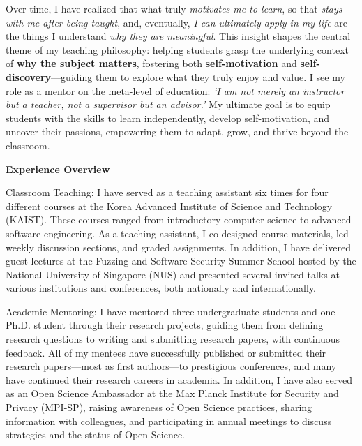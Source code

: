 \documentclass{article}
\begin{document}
\thispagestyle{firstpage} %

\noindent Over time, I have realized that what truly \emph{motivates me to learn}, so that \emph{stays with me after being taught}, and, eventually, \emph{I can ultimately apply in my life} are the things I understand \emph{why they are meaningful}. This insight shapes the central theme of my teaching philosophy: helping students grasp the underlying context of \textbf{why the subject matters}, fostering both \textbf{self-motivation} and \textbf{self-discovery}—guiding them to explore what they truly enjoy and value. I see my role as a mentor on the meta-level of education: \emph{`I am not merely an instructor but a teacher, not a supervisor but an advisor.'} My ultimate goal is to equip students with the skills to learn independently, develop self-motivation, and uncover their passions, empowering them to adapt, grow, and thrive beyond the classroom.

\vspace{.5em}\noindent\textbf{Experience Overview}\vspace{.5em}

\noindent Classroom Teaching: I have served as a teaching assistant six times for four different courses at the Korea Advanced Institute of Science and Technology (KAIST). These courses ranged from introductory computer science to advanced software engineering. As a teaching assistant, I co-designed course materials, led weekly discussion sections, and graded assignments.
In addition, I have delivered guest lectures at the Fuzzing and Software Security Summer School hosted by the National University of Singapore (NUS) and presented several invited talks at various institutions and conferences, both nationally and internationally.

\vspace{0.5em}
\noindent Academic Mentoring:  I have mentored three undergraduate students and one Ph.D. student through their research projects, guiding them from defining research questions to writing and submitting research papers, with continuous feedback. All of my mentees have successfully published or submitted their research papers—most as first authors—to prestigious conferences, and many have continued their research careers in academia. In addition, I have also served as an Open Science Ambassador at the Max Planck Institute for Security and Privacy (MPI-SP), raising awareness of Open Science practices, sharing information with colleagues, and participating in annual meetings to discuss strategies and the status of Open Science.
\end{document}
